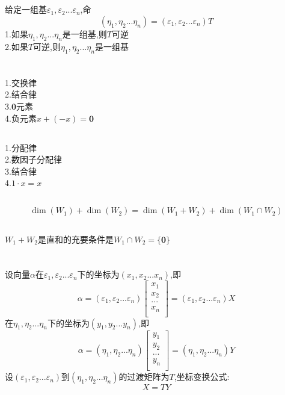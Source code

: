 \documentclass[11pt, a4paper, UTF8]{ctexart}
\begin{document}
\subsection{}
给定一组基$\varepsilon_1,\varepsilon_2...\varepsilon_n$,命
\[(\eta_1,\eta_2...\eta_n)=(\varepsilon_1,\varepsilon_2...\varepsilon_n)T\]
1.如果$\eta_1,\eta_2...\eta_n$是一组基,则$T$可逆\\
2.如果$T$可逆,则$\eta_1,\eta_2...\eta_n$是一组基
\section{}
\subsection{}
1.交换律\\
2.结合律\\
3.$\bm0$元素\\
4.负元素$x+(-x)=\bm0$\\
\subsection{}
1.分配律\\
2.数因子分配律\\
3.结合律\\
4.$1\cdot x=x$\\
\subsection{}
\[\dim(W_1)+\dim(W_2)=\dim(W_1+W_2)+\dim(W_1\cap W_2)\]
\subsection{}
$W_1+W_2$是直和的充要条件是$W_1\cap W_2=\{\bm0\}$\\
\section{}
设向量$\alpha$在$\varepsilon_1,\varepsilon_2...\varepsilon_n$下的坐标为$(x_1,x_2...x_n)$,即
\[\alpha=(\varepsilon_1,\varepsilon_2...\varepsilon_n)\begin{bmatrix}
x_1\\
x_2\\
...\\
x_n\\
\end{bmatrix}=(\varepsilon_1,\varepsilon_2...\varepsilon_n)X\]
在$\eta_1,\eta_2...\eta_n$下的坐标为$(y_1,y_2...y_n)$,即\\
\[\alpha=(\eta_1,\eta_2...\eta_n)\begin{bmatrix}
y_1\\
y_2\\
...\\
y_n\\
\end{bmatrix}=(\eta_1,\eta_2...\eta_n)Y\]
设$(\varepsilon_1,\varepsilon_2...\varepsilon_n)$到$(\eta_1,\eta_2...\eta_n)$的过渡矩阵为$T$,坐标变换公式:
\[X=TY\]
\end{document}
